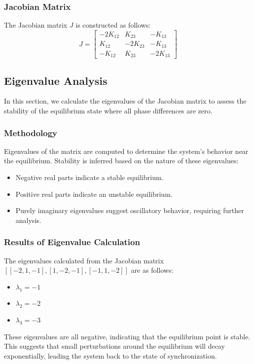 \documentclass[12pt,a4paper]{article}
\begin{document}
\subsubsection{Jacobian Matrix}
The Jacobian matrix $J$ is constructed as follows:
\[
J = \begin{bmatrix}
-2K_{12} & K_{23} & -K_{13} \\
K_{12} & -2K_{23} & -K_{13} \\
-K_{12} & K_{23} & -2K_{13}
\end{bmatrix}
\]

\subsection{Eigenvalue Analysis}

In this section, we calculate the eigenvalues of the Jacobian matrix to assess the stability of the equilibrium state where all phase differences are zero.

\subsubsection{Methodology}
Eigenvalues of the matrix are computed to determine the system's behavior near the equilibrium. Stability is inferred based on the nature of these eigenvalues:
\begin{itemize}
    \item Negative real parts indicate a stable equilibrium.
    \item Positive real parts indicate an unstable equilibrium.
    \item Purely imaginary eigenvalues suggest oscillatory behavior, requiring further analysis.
\end{itemize}

\subsubsection{Results of Eigenvalue Calculation}
The eigenvalues calculated from the Jacobian matrix \([[-2, 1, -1], [1, -2, -1], [-1, 1, -2]]\) are as follows:
\begin{itemize}
    \item $\lambda_1 = -1$
    \item $\lambda_2 = -2$
    \item $\lambda_3 = -3$
\end{itemize}
These eigenvalues are all negative, indicating that the equilibrium point is stable. This suggests that small perturbations around the equilibrium will decay exponentially, leading the system back to the state of synchronization.
\end{document}
